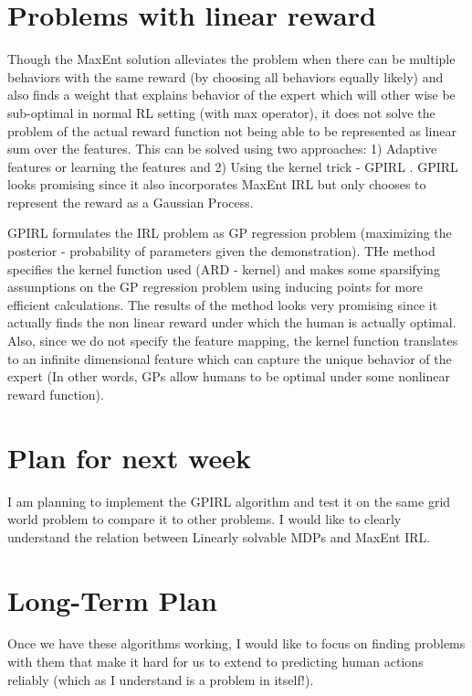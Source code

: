 \documentclass{article}[11pt]
\begin{document}
\section{Problems with linear reward}

Though the MaxEnt solution alleviates the problem when there can be multiple behaviors with the same reward (by choosing all behaviors equally likely) and also finds a weight that explains behavior of the expert which will other wise be sub-optimal in normal RL setting (with max operator), it does not solve the problem of the actual reward function not being able to be represented as linear sum over the features. This can be solved using two approaches: 1) Adaptive features or learning the features \cite{dvijotham2010inverse, levine2010feature} and 2) Using the kernel trick - GPIRL \cite{levine2011nonlinear}. GPIRL looks promising since it also incorporates MaxEnt IRL but only chooses to represent the reward as a Gaussian Process. 

GPIRL formulates the IRL problem as GP regression problem (maximizing the posterior - probability of parameters given the demonstration). THe method specifies the kernel function used (ARD - kernel) and makes some sparsifying assumptions on the GP regression problem using inducing points \cite{quinonero2005unifying} for more efficient calculations. The results of the method looks very promising since it actually finds the non linear reward under which the human is actually optimal. Also, since we do not specify the feature mapping, the kernel function translates to an infinite dimensional feature which can capture the unique behavior of the expert (In other words, GPs allow humans to be optimal under some nonlinear reward function). 




\section{Plan for next week}
I am planning to implement the GPIRL algorithm and test it on the same grid world problem to compare it to other problems. I would like to clearly understand the relation between Linearly solvable MDPs and MaxEnt IRL. 

\section{Long-Term Plan}
Once we have these algorithms working, I would like to focus on finding problems with them that make it hard for us to extend to predicting human actions reliably (which as I understand is a problem in itself!). 
\end{document}
